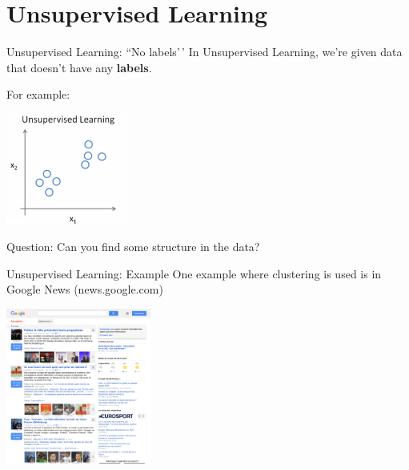 \documentclass[
  9pt,
  ignorenonframetext,
  aspectratio=169,
  t, dvipsnames]{beamer}
\theoremstyle{definition}
\begin{document}
\hypertarget{unsupervised-learning}{%
\section{Unsupervised Learning}\label{unsupervised-learning}}

\begin{frame}{Unsupervised Learning: ``No labels'\,'}
\protect\hypertarget{unsupervised-learning-no-labels}{}
In Unsupervised Learning, we're given data that doesn't have any
\textbf{labels}.

For example:

\begin{center}
\includegraphics[width=150px]{img/ul1}
\end{center}

Question: Can you find some structure in the data?
\end{frame}

\begin{frame}{Unsupervised Learning: Example}
\protect\hypertarget{unsupervised-learning-example}{}
One example where clustering is used is in Google News (news.google.com)

\begin{center}
\includegraphics[width=180px]{img/googlenews}
\end{center}
\end{frame}
\end{document}
